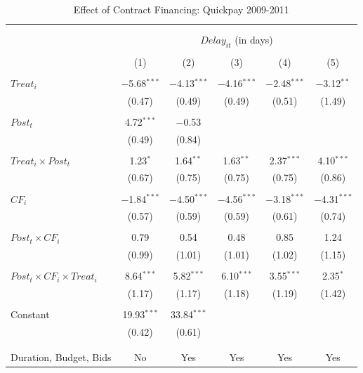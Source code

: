 \documentclass[
]{article}
\begin{document}
\begin{table}[H] \centering 
  \caption{Effect of Contract Financing: Quickpay 2009-2011} 
  \label{} 
\small 
\begin{tabular}{@{\extracolsep{-2pt}}lccccc} 
\\[-1.8ex]\hline 
\hline \\[-1.8ex] 
\\[-1.8ex] & \multicolumn{5}{c}{$Delay_{it}$ (in days)} \\ 
\\[-1.8ex] & (1) & (2) & (3) & (4) & (5)\\ 
\hline \\[-1.8ex] 
 $Treat_i$ & $-$5.68$^{***}$ & $-$4.13$^{***}$ & $-$4.16$^{***}$ & $-$2.48$^{***}$ & $-$3.12$^{**}$ \\ 
  & (0.47) & (0.49) & (0.49) & (0.51) & (1.49) \\ 
  & & & & & \\ 
 $Post_t$ & 4.72$^{***}$ & $-$0.53 &  &  &  \\ 
  & (0.49) & (0.84) &  &  &  \\ 
  & & & & & \\ 
 $Treat_i \times Post_t$ & 1.23$^{*}$ & 1.64$^{**}$ & 1.63$^{**}$ & 2.37$^{***}$ & 4.10$^{***}$ \\ 
  & (0.67) & (0.75) & (0.75) & (0.75) & (0.86) \\ 
  & & & & & \\ 
 $CF_i$ & $-$1.84$^{***}$ & $-$4.50$^{***}$ & $-$4.56$^{***}$ & $-$3.18$^{***}$ & $-$4.31$^{***}$ \\ 
  & (0.57) & (0.59) & (0.59) & (0.61) & (0.74) \\ 
  & & & & & \\ 
 $Post_t \times CF_i$ & 0.79 & 0.54 & 0.48 & 0.85 & 1.24 \\ 
  & (0.99) & (1.01) & (1.01) & (1.02) & (1.15) \\ 
  & & & & & \\ 
 $Post_t \times CF_i \times Treat_i$ & 8.64$^{***}$ & 5.82$^{***}$ & 6.10$^{***}$ & 3.55$^{***}$ & 2.35$^{*}$ \\ 
  & (1.17) & (1.17) & (1.18) & (1.19) & (1.42) \\ 
  & & & & & \\ 
 Constant & 19.93$^{***}$ & 33.84$^{***}$ &  &  &  \\ 
  & (0.42) & (0.61) &  &  &  \\ 
  & & & & & \\ 
\hline \\[-1.8ex] 
Duration, Budget, Bids & No & Yes & Yes & Yes & Yes \\ 

\end{tabular}
\end{table}
\end{document}
